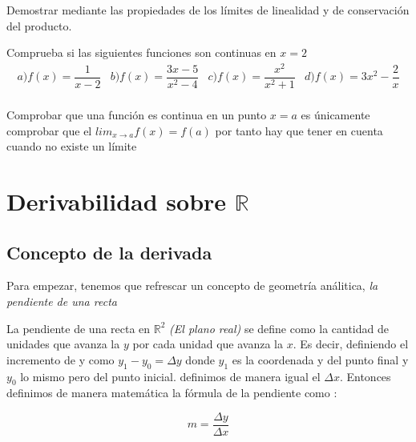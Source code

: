\begin{ejercicio}
Demostrar mediante las propiedades de los límites de linealidad y de conservación del producto.
\end{ejercicio}

\begin{ejercicio}
Comprueba si las siguientes funciones son continuas en $x=2$
\begin{equation*}
\begin{array}{rrrr}
a) f(x)=\dfrac{1}{x-2}& b)f(x)=\dfrac{3x-5}{x^2-4}& c)f(x)=\dfrac{x^2}{x^2+1}& d)f(x)=3x^2-\dfrac{2}{x}\\
\end{array}
\end{equation*}

Comprobar que una función es continua en un punto $x=a$ es únicamente comprobar que el $\displaystyle lim_{x\to a} f(x)=f(a)$ por tanto hay que tener en cuenta cuando no existe un límite



\end{ejercicio}






\chapter{Derivabilidad sobre $\mathbb{R}$}

\minitoc

\newpage


\section{Concepto de la derivada}
Para empezar, tenemos que refrescar un concepto de geometría análitica, \emph{la pendiente de una recta}
\begin{defi}
La pendiente de una recta en $\mathbb{R}^2$ \emph{(El plano real)} se define como la cantidad de unidades que avanza la $y$ por cada unidad que avanza la $x$. Es decir, definiendo el incremento de y como $y_1-y_0=\Delta y$ donde $y_1$ es la coordenada y del punto final y $y_0$ lo mismo pero del punto inicial. definimos de manera igual el $\Delta x$. Entonces definimos de manera matemática la fórmula de la pendiente como :
\end{defi}
\begin{equation*}
m=\dfrac{\Delta y}{\Delta x}
\end{equation*}

